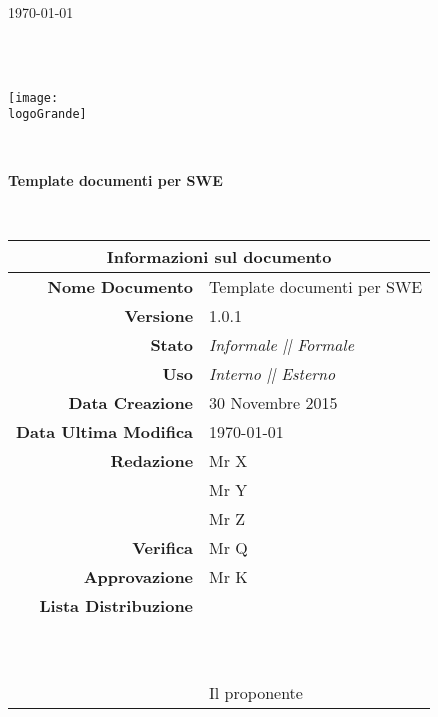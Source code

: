 \documentclass[12pt,a4paper]{article}
\title{\titoloDocumento}
\newcommand{\titoloDocumento}{Template documenti per SWE}
\newcommand{\dataCreazione}{30 Novembre 2015}
\newcommand{\versione}{1.0.1}
\newcommand{\stato}{Informale || Formale}
\newcommand{\uso}{Interno || Esterno}
\begin{document}
\begin{titlepage}
\begin{center}
\today \\
\vspace{1cm}
\begin{Huge}
\textbf{\nomeGruppo} \\
\end{Huge}
\textbf{\prjL} \\
\vspace{1cm}
\texttt{[image: \\logoGrande]}
\vspace{1cm}

\HRule \\[0.4cm]
\begin{Huge}
{\huge \bfseries \titoloDocumento}\\[0.4cm]
\end{Huge}
\HRule \\[1cm]
\vfill

\begin{table}[h]
\begin{center}
\begin{tabular}{r | l}
\multicolumn{2}{c}{\textbf{Informazioni sul documento}}\\
\midrule
\textbf{Nome Documento}	&	\titoloDocumento	\\
\textbf{Versione}	&	\versione	\\
\textbf{Stato}	&	\emph{\stato}	\\
\textbf{Uso}	&	\emph{\uso}	\\
\textbf{Data Creazione}	&	\dataCreazione	\\
\textbf{Data Ultima Modifica}	&	\today	\\
\textbf{Redazione}	&	Mr X	\\
\ 	&	Mr Y	\\
\ 	&	Mr Z	\\
\textbf{Verifica}	&	Mr Q	\\
\textbf{Approvazione}	&	Mr K	\\
\textbf{Lista Distribuzione}	&	\nomeGruppo	\\
\ 	&	\Vardanega	\\
\ 	&	\Cardin	\\
\ 	&	Il proponente \Zucchetti	\\

\end{tabular}
\end{center}
\end{table}

\end{center}
\end{titlepage}
\newpage
\end{document}
